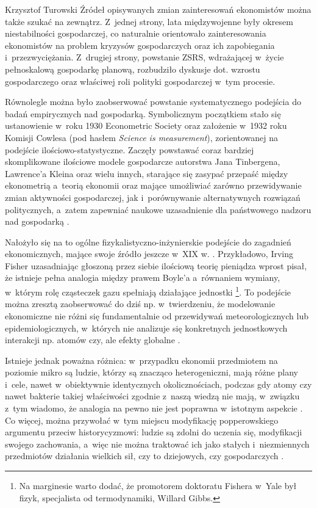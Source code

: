 \begin{artplenv}{Krzysztof Turowski}
Źródeł opisywanych zmian zainteresowań ekonomistów można także szukać na zewnątrz. Z~jednej strony, lata międzywojenne
były okresem niestabilności gospodarczej, co naturalnie orientowało zainteresowania ekonomistów na problem kryzysów
gospodarczych oraz ich zapobiegania i~przezwyciężania. Z~drugiej strony, powstanie ZSRS, wdrażającej w~życie
pełnoskalową gospodarkę planową, rozbudziło dyskusje dot. wzrostu gospodarczego oraz właściwej roli polityki
gospodarczej w~tym procesie.

Równolegle można było zaobserwować powstanie systematycznego podejścia do badań empirycznych nad gospodarką.
Symbolicznym początkiem stało się ustanowienie w~roku 1930 Econometric Society oraz założenie w~1932 roku Komisji
Cowlesa (pod hasłem \textit{Science is measurement}), zorientowanej na podejście ilościowo-statystyczne. Zaczęły
powstawać coraz bardziej skomplikowane ilościowe modele gospodarcze autorstwa Jana Tinbergena, Lawrence’a Kleina oraz
wielu innych, starające się zasypać przepaść między ekonometrią a~teorią ekonomii oraz mające umożliwiać zarówno
przewidywanie zmian aktywności gospodarczej, jak i~porównywanie alternatywnych rozwiązań politycznych, a~zatem
zapewniać naukowe uzasadnienie dla państwowego nadzoru nad gospodarką
\parencite{de_vroey_keynesian_2012}.

Nałożyło się na to ogólne fizykalistyczno-inżynierskie podejście do zagadnień ekonomicznych, mające swoje źródło jeszcze
w~XIX w.
\parencite{mirowski_more_1999}.
Przykładowo, Irving Fisher uzasadniając głoszoną przez siebie
ilościową teorię pieniądza wprost pisał, że istnieje pełna analogia między prawem Boyle’a a~równaniem wymiany, w~którym
rolę cząsteczek gazu spełniają działające jednostki
\parencite{fisher_purchasing_1922}\footnote{Na marginesie warto dodać, że promotorem
doktoratu Fishera w~Yale był fizyk, specjalista od termodynamiki, Willard Gibbs.}. To podejście można zresztą
zaobserwować do dziś np. w~twierdzeniu, że modelowanie ekonomiczne nie różni się fundamentalnie od przewidywań
meteorologicznych lub epidemiologicznych, w~których nie analizuje się konkretnych jednostkowych interakcji np. atomów
czy, ale efekty globalne
\parencite{buchanan_forecast:_2013}.

Istnieje jednak poważna różnica: w~przypadku ekonomii przedmiotem na poziomie mikro są ludzie, którzy są znacząco
heterogeniczni, mają różne plany i~cele, nawet w~obiektywnie identycznych okolicznościach, podczas gdy atomy czy nawet
bakterie takiej właściwości zgodnie z~naszą wiedzą nie mają, w~związku z~tym wiadomo, że analogia na pewno nie jest
poprawna w~istotnym aspekcie
\parencite{penrose_biological_1952}.
Co więcej, można przywołać w~tym miejscu
modyfikację popperowskiego argumentu przeciw historycyzmowi: ludzie są zdolni do uczenia się, modyfikacji swojego
zachowania, a~więc nie można traktować ich jako stałych i~niezmiennych przedmiotów działania wielkich sił, czy to
dziejowych, czy gospodarczych
\parencite{popper_poverty_1957,hoppe_economic_1995}.


\end{artplenv}
